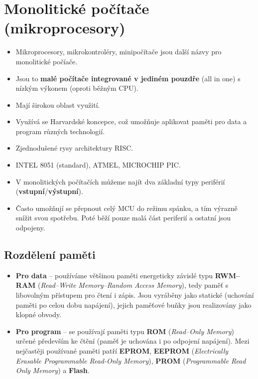 \section{Monolitické počítače (mikroprocesory)}
\begin{itemize}
    \item Mikroprocesory, mikrokontroléry, minipočítače jsou další názvy pro monolitické počíače.
    \item Jsou to \textbf{malé počítače integrované v jediném pouzdře} (all in one) s nízkým výkonem (oproti běžným CPU).
    \item Mají širokou oblast využití.
    \item Využívá se Harvardské koncepce, což umožňuje aplikovat paměti pro data a program různých technologií.
    \item Zjednodušené rysy architektury RISC.
    \item INTEL 8051 (standard), ATMEL, MICROCHIP PIC.
    \item V monolitických počítačích můžeme najít dva základní typy periférií (\textbf{vstupní}/\textbf{výstupní}).
    \item Často umožňují se přepnout celý MCU do režimu spánku, a tím výrazně snížit svou spotřebu. Poté běží pouze malá část periferií a ostatní jsou odpojeny.
\end{itemize}

\subsection{Rozdělení paměti}
\begin{itemize}
    \item \textbf{Pro data} -- používáme většinou paměti energeticky závislé typu \textbf{RWM--RAM} (\textit{Read--Write Memory--Random Access Memory}), tedy paměť s libovolným přístupem pro čtení i zápis. Jsou vyráběny jako statické (uchování paměti po celou dobu napájení), jejich paměťové buňky jsou realizovány jako klopné obvody.
    \item \textbf{Pro program} -- se používají paměti typu \textbf{ROM} (\textit{Read--Only Memory}) určené především ke čtění (paměť je uchována i po odpojení napájení). Mezi nejčastěji používané paměti patří \textbf{EPROM}, \textbf{EEPROM} (\textit{Electrically Erasable Programmable Read-Only Memory}), \textbf{PROM} (\textit{Programmable Read Only Memory}) a \textbf{Flash}.
\end{itemize}

